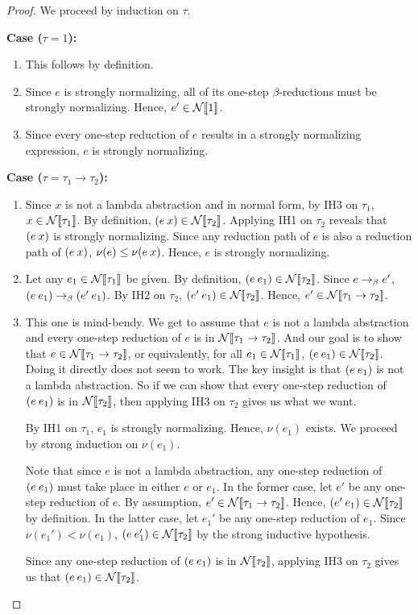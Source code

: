 \documentclass{article}
\theoremstyle{definition}
\begin{document}
\begin{proof}
  We proceed by induction on $\tau$.

  \textbf{Case ($\tau = 1$):}
  \begin{enumerate}
  \item This follows by definition.
  \item Since $e$ is strongly normalizing, all of its one-step $\beta$-reductions must be strongly normalizing.
    Hence, $e' \in \mathcal{N}\llbracket1\rrbracket$.
  \item Since every one-step reduction of $e$ results in a strongly normalizing expression, $e$ is strongly normalizing.
  \end{enumerate}

  \textbf{Case ($\tau = \tau_{1} \to \tau_{2}$):}
  \begin{enumerate}
  \item Since $x$ is not a lambda abstraction and in normal form, by IH3 on $\tau_{1}$, $x \in \mathcal{N}\llbracket\tau_{1}\rrbracket$.
    By definition, $(e\mkern4mux) \in \mathcal{N}\llbracket\tau_{2}\rrbracket$.
    Applying IH1 on $\tau_{2}$ reveals that $(e\mkern4mux)$ is strongly normalizing.
    Since any reduction path of $e$ is also a reduction path of $(e\mkern4mux)$, $\nu(e) \leq \nu(e\mkern4mux)$.
    Hence, $e$ is strongly normalizing.
  \item Let any $e_{1} \in \mathcal{N}\llbracket\tau_{1}\rrbracket$ be given.
    By definition, $(e\mkern4mue_{1}) \in \mathcal{N}\llbracket\tau_{2}\rrbracket$.
    Since $e\to_{\beta}e'$, $(e\mkern4mue_{1})\to_{\beta}(e'\mkern4mue_{1})$.
    By IH2 on $\tau_{2}$, $(e'\mkern4mue_{1}) \in \mathcal{N}\llbracket\tau_{2}\rrbracket$.
    Hence, $e' \in \mathcal{N}\llbracket\tau_{1} \to \tau_{2}\rrbracket$.
  \item This one is mind-bendy.
    We get to assume that $e$ is not a lambda abstraction and every one-step reduction of $e$ is in $\mathcal{N}\llbracket\tau_{1} \to \tau_{2}\rrbracket$.
    And our goal is to show that $e \in \mathcal{N}\llbracket\tau_{1} \to \tau_{2}\rrbracket$, or equivalently, for all $e_{1} \in \mathcal{N}\llbracket\tau_{1}\rrbracket$, $(e\mkern4mue_{1}) \in \mathcal{N}\llbracket\tau_{2}\rrbracket$.
    Doing it directly does not seem to work.
    The key insight is that $(e\mkern4mue_{1})$ is not a lambda abstraction.
    So if we can show that every one-step reduction of $(e\mkern4mue_{1})$ is in $\mathcal{N}\llbracket\tau_{2}\rrbracket$, then applying IH3 on $\tau_{2}$ gives us what we want.

    By IH1 on $\tau_{1}$, $e_{1}$ is strongly normalizing.
    Hence, $\nu(e_{1})$ exists.
    We proceed by strong induction on $\nu(e_{1})$.
    
    Note that since $e$ is not a lambda abstraction, any one-step reduction of $(e\mkern4mue_{1})$ must take place in either $e$ or $e_{1}$.
    In the former case, let $e'$ be any one-step reduction of $e$.
    By assumption, $e' \in \mathcal{N}\llbracket\tau_{1} \to \tau_{2}\rrbracket$.
    Hence, $(e'\mkern4mue_{1}) \in \mathcal{N}\llbracket\tau_{2}\rrbracket$ by definition.
    In the latter case, let $e_{1}'$ be any one-step reduction of $e_{1}$.
    Since $\nu(e_{1}') < \nu(e_{1})$, $(e\mkern4mue_{1}') \in \mathcal{N}\llbracket\tau_{2}\rrbracket$ by the strong inductive hypothesis.

    Since any one-step reduction of $(e\mkern4mue_{1})$ is in $\mathcal{N}\llbracket\tau_{2}\rrbracket$, applying IH3 on $\tau_{2}$ gives us that $(e\mkern4mue_{1}) \in \mathcal{N}\llbracket\tau_{2}\rrbracket$.
  \end{enumerate}
\end{proof}
\end{document}
